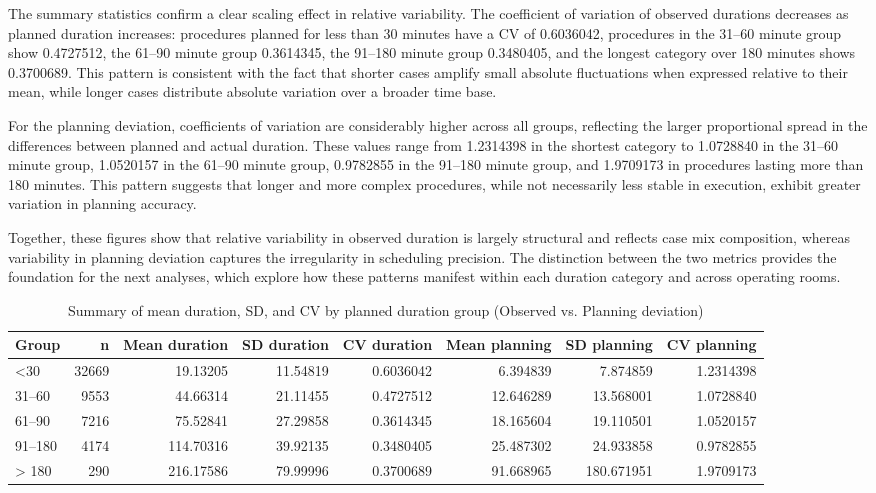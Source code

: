 \documentclass[
]{article}
\begin{document}
The summary statistics confirm a clear scaling effect in relative
variability. The coefficient of variation of observed durations
decreases as planned duration increases: procedures planned for less
than 30 minutes have a CV of 0.6036042, procedures in the 31--60 minute
group show 0.4727512, the 61--90 minute group 0.3614345, the 91--180
minute group 0.3480405, and the longest category over 180 minutes shows
0.3700689. This pattern is consistent with the fact that shorter cases
amplify small absolute fluctuations when expressed relative to their
mean, while longer cases distribute absolute variation over a broader
time base.

For the planning deviation, coefficients of variation are considerably
higher across all groups, reflecting the larger proportional spread in
the differences between planned and actual duration. These values range
from 1.2314398 in the shortest category to 1.0728840 in the 31--60
minute group, 1.0520157 in the 61--90 minute group, 0.9782855 in the
91--180 minute group, and 1.9709173 in procedures lasting more than 180
minutes. This pattern suggests that longer and more complex procedures,
while not necessarily less stable in execution, exhibit greater
variation in planning accuracy.

Together, these figures show that relative variability in observed
duration is largely structural and reflects case mix composition,
whereas variability in planning deviation captures the irregularity in
scheduling precision. The distinction between the two metrics provides
the foundation for the next analyses, which explore how these patterns
manifest within each duration category and across operating rooms.

\begin{table}

\caption{\label{tab:cv group}Summary of mean duration, SD, and CV by planned duration group (Observed vs. Planning deviation) \label{tab:cv_group}}
\centering
\begin{tabular}[t]{lrrrrrrr}
\toprule
Group & n & Mean duration & SD duration & CV duration & Mean planning & SD planning & CV planning\\
\midrule
<30 & 32669 & 19.13205 & 11.54819 & 0.6036042 & 6.394839 & 7.874859 & 1.2314398\\
31–60 & 9553 & 44.66314 & 21.11455 & 0.4727512 & 12.646289 & 13.568001 & 1.0728840\\
61–90 & 7216 & 75.52841 & 27.29858 & 0.3614345 & 18.165604 & 19.110501 & 1.0520157\\
91–180 & 4174 & 114.70316 & 39.92135 & 0.3480405 & 25.487302 & 24.933858 & 0.9782855\\
> 180 & 290 & 216.17586 & 79.99996 & 0.3700689 & 91.668965 & 180.671951 & 1.9709173\\
\bottomrule
\end{tabular}
\end{table}
\end{document}
